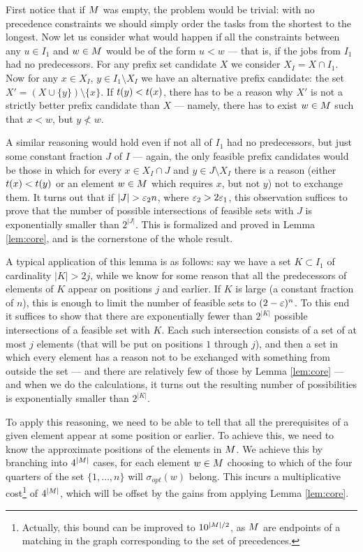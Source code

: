\documentclass{article}
\theoremstyle{definition}
\begin{document}
First notice that if $M$ was empty, the problem would be trivial: with no
precedence constraints we should simply order the tasks from the shortest to the longest.
Now let us consider what would happen if all the constraints between any $u \in I_1$ and
$w \in M$ would be of the form $u < w$ --- that is, if the jobs from $I_1$ had no predecessors.
For any prefix set candidate $X$ we consider $X_I = X \cap I_1$.
Now for any $x \in X_I$, $y \in I_1 \setminus X_I$ we have an alternative prefix candidate:
the set $X' = (X \cup \{y\}) \setminus \{x\}$. If $t(y) < t(x)$, there has to be a reason
why $X'$ is not a strictly better prefix candidate than $X$ --- namely, there has to exist
$w \in M$ such that $x < w$, but $y\not< w$.

A similar reasoning would hold even if not all of $I_1$ had no predecessors, but just some
constant fraction $J$ of $I$ --- again, the only feasible prefix candidates would be those
in which for every $x \in X_I \cap J$ and $y \in J \setminus X_I$ there is a reason (either
$t(x) < t(y)$ or an element $w \in M$ which requires $x$, but not $y$) not to exchange them.
It turns out that if $|J| > \varepsilon_2 n$, where $\varepsilon_2 > 2 \varepsilon_1$, this observation suffices
to prove that the number of possible intersections of feasible sets with $J$ is exponentially
smaller than $2^{|J|}$. This is formalized and proved in
Lemma \ref{lem:core}, and is the cornerstone of the whole result.

A typical application of this lemma is as follows: say we have a set $K \subset I_1$ of
cardinality $|K| > 2j$, while
we know for some reason that all the predecessors of elements of $K$ appear on positions
$j$ and earlier. If $K$ is large (a constant fraction of $n$), this is enough to limit
the number of feasible sets to $(2-\varepsilon)^n$. To this end it suffices
to show that there are exponentially
fewer than $2^{|K|}$ possible intersections of a feasible set with $K$. Each such intersection
consists of a set of at most $j$ elements (that will be put on positions $1$ through $j$),
and then a set in which every element has a reason not to be exchanged with something from
outside the set --- and there are relatively few of those by Lemma \ref{lem:core}
--- and when we do the calculations, it turns out the resulting number of
possibilities is exponentially smaller than $2^{|K|}$.

To apply this reasoning, we need to be able to tell that all the prerequisites of a given
element appear at some position or earlier. To achieve this, we need to know the approximate
positions of the elements in $M$. We achieve this by branching into $4^{|M|}$ cases,
for each element $w \in M$ choosing to which of the four quarters of the set
$\{1,\ldots,n\}$ will $\sigma_{opt}(w)$ belong. This incurs a multiplicative cost\footnote{Actually, this bound can be improved to $10^{|M|/2}$, as $M$ are endpoints of a matching in the graph corresponding to the set of precedences.}
of $4^{|M|}$,
which will be offset by the gains from applying Lemma \ref{lem:core}.
\end{document}
